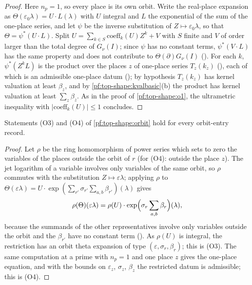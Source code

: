 \begin{proof}
Here $n_p=1$, so every place is its own orbit. Write the real-place expansion as $\Theta(\varepsilon_0\lambda)=U\cdot
L(\lambda)$ with $U$ integral and $L$ the exponential of the sum of the one-place series, and let $\psi$ be the inverse
substitution of $Z\mapsto\varepsilon_0\lambda$, so that $\Theta=\psi^*(U\cdot L)$. Split $U=\sum_{k\in S}\mathrm{coeff}_k(U)Z^k+V$
with $S$ finite and $V$ of order larger than the total degree of $G_\nu(I)$; since $\psi$ has no constant terms,
$\psi^*(V\cdot L)$ has the same property and does not contribute to $\Theta(\partial)G_\nu(I)$
(). For each $k$, $\psi^*(Z^kL)$ is the product over the places $z$ of one-place
series $T_z(k_z)$ (), each of which is an admissible one-place datum
(); by hypothesis $T_z(k_z)$ has kernel valuation at least $\beta_z$, and
by \cref{pf:top-shape:kvalbasic}(b) the product has kernel valuation at least $\sum_z\beta_z$. As in the proof of
\cref{pf:top-shape:o1}, the ultrametric inequality with $|\mathrm{coeff}_k(U)|\le1$ concludes.
\end{proof}

\begin{proposition}[(O3), (O4) Restriction]\label{pf:top-shape:o34}
Statements (O3) and (O4) of \cref{pf:top-shape:orbit} hold for every orbit-entry record.
\end{proposition}

\begin{proof}
Let $\rho$ be the ring homomorphism of power series which sets to zero the variables of the places outside the orbit of
$r$ (for (O4): outside the place $z$). The jet logarithm of a variable involves only variables of the same orbit, so
$\rho$ commutes with the substitution $Z\mapsto\varepsilon\lambda$; applying $\rho$ to $\Theta(\varepsilon\lambda)=U\cdot
\exp(\sum_{r'}\sigma_{r'}\sum_{a,b}\beta_{r'})(\lambda)$ gives
\[
\rho(\Theta)(\varepsilon\lambda)=\rho(U)\cdot\exp\Bigl(\sigma_r\sum_{a,b}\beta_r\Bigr)(\lambda),
\]
because the summands of the other representatives involve only variables outside the orbit and the $\beta_{r'}$ have no
constant term (). As $\rho(U)$ is integral, the restriction has an
orbit theta expansion of type $(\varepsilon,\sigma_r,\beta_r)$; this is (O3). The same computation at a prime with $n_p=1$
and one place $z$ gives the one-place equation, and with the bounds on $\varepsilon_z$, $\sigma_z$, $\beta_z$ the restricted
datum is admissible; this is (O4).
\end{proof}

